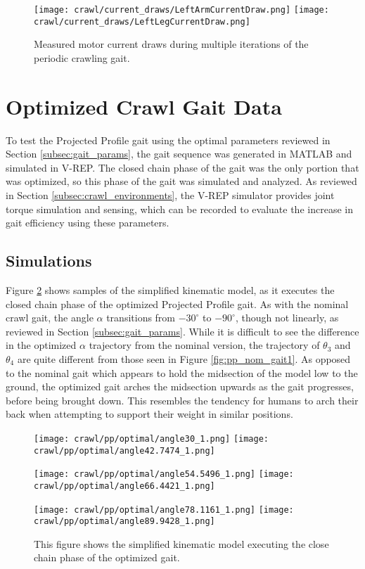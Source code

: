 \begin{figure}
  \centerline{
    \texttt{[image: crawl/current\_draws/LeftArmCurrentDraw.png]}
    \texttt{[image: crawl/current\_draws/LeftLegCurrentDraw.png]}
  }
  \caption{Measured motor current draws during multiple iterations of the periodic crawling gait.}
  \label{fig:nao_currents}
\end{figure}




\FloatBarrier
\section{Optimized Crawl Gait Data} \label{sec:opt_crawl_data}

To test the Projected Profile gait using the optimal parameters reviewed in 
Section \ref{subsec:gait_params}, the gait sequence was generated in
MATLAB and simulated in V-REP. The closed chain phase of the gait was the
only portion that was optimized, so this phase of the gait was simulated and
analyzed. As reviewed in Section \ref{subsec:crawl_environments}, the V-REP simulator
provides joint torque simulation and sensing, which can be recorded to evaluate
the increase in gait efficiency using these parameters.

\subsection{Simulations}

Figure \ref{fig:pp_opt_gait1} shows samples of the simplified kinematic model,
as it executes the closed chain phase of the optimized Projected Profile gait.
As with the nominal crawl gait, the angle $\alpha$ transitions from $-30^\circ$ to $-90^\circ$,
though not linearly, as reviewed in Section \ref{subsec:gait_params}.
While it is difficult to see the difference in the optimized $\alpha$ trajectory from the
nominal version, the trajectory of $\theta_3$ and $\theta_4$ are quite different
from those seen in Figure \ref{fig:pp_nom_gait1}. As opposed to the nominal gait
which appears to hold the midsection of the model low to the ground, the optimized
gait arches the midsection upwards as the gait progresses, before being brought down. This resembles the tendency for humans to arch their back when attempting
to support their weight in similar positions.

\begin{figure}
  \centerline{
    \texttt{[image: crawl/pp/optimal/angle30\_1.png]}
    \texttt{[image: crawl/pp/optimal/angle42.7474\_1.png]}
  }
  \centerline{
    \texttt{[image: crawl/pp/optimal/angle54.5496\_1.png]}
    \texttt{[image: crawl/pp/optimal/angle66.4421\_1.png]}
  }
  \centerline{
    \texttt{[image: crawl/pp/optimal/angle78.1161\_1.png]}
    \texttt{[image: crawl/pp/optimal/angle89.9428\_1.png]}
  }
  \caption{This figure shows the simplified kinematic model executing the close
           chain phase of the optimized gait.}
  \label{fig:pp_opt_gait1}
\end{figure}

